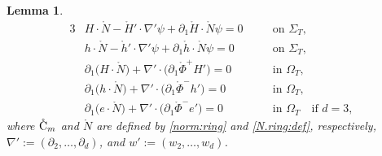 \documentclass[twoside,11pt]{article}
\numberwithin{equation}{section}
\newtheorem{lemma}{Lemma}[section]
\def\p{\partial}
\begin{document}
\begin{lemma}
\begin{alignat}{3}
			\label{H.cons3}	
&H\cdot\mathring{N}-\mathring{H}'\cdot \nabla'\psi+\p_1\mathring{H}\cdot\mathring{N}\psi =0 && \textrm{on } \Sigma_{T},\\[0.5mm]			
			\label{h.cons3}		
			&h\cdot\mathring{N}-\mathring{h}'\cdot \nabla'\psi+\p_1\mathring{h}\cdot\mathring{N}\psi =0&&  \textrm{on } \Sigma_{T},	 \\[0.5mm]		
\label{H.inv3}	
&\p_1\big(H\cdot\mathring{N}\big)+\nabla'\cdot\big(\p_1\mathring{\Phi}^+ H'\big) =0
&\quad& \textrm{in }\Omega_T,\\[0.5mm]	
			\label{h.inv3}	
&\p_1\big(h\cdot\mathring{N}\big)+\nabla'\cdot \big(\p_1\mathring{\Phi}^- h'\big) =0	&&	
\textrm{in }\Omega_T,\\[0.5mm]				
			\label{e.inv3}	
			&\p_1\big(e\cdot\mathring{N}\big)+\nabla'\cdot\big(\p_1\mathring{\Phi}^- e'\big)=0 &&	
			\textrm{in }\Omega_T\quad \textrm{if }d=3 ,
		\end{alignat}	
where 		$\mathring{\rm C}_{m}$
and $\mathring{N}$ are defined by \eqref{norm:ring} and \eqref{N.ring:def}, respectively,
$\nabla':=(\p_2,\ldots,\p_d)$, and $w':=(w_2,\ldots,w_d)$.
	\end{lemma}
\end{document}
